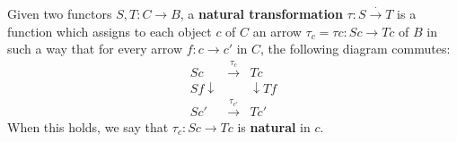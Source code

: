 Given two functors $S, T: C \rightarrow B$, a \textbf{natural transformation} $\tau: S \xrightarrow{\cdot} T$ is a function which assigns to each object $c$ of $C$ an arrow $\tau_c = \tau c: Sc \rightarrow Tc$ of $B$ in such a way that for every arrow $f: c \rightarrow c'$ in $C$, the following diagram commutes:
\[
\begin{array}{ccc}
Sc & \xrightarrow{\tau_c} & Tc \\
{\scriptstyle Sf}\downarrow & & \downarrow{\scriptstyle Tf} \\
Sc' & \xrightarrow{\tau_{c'}} & Tc'
\end{array}
\]
When this holds, we say that $\tau_c: Sc \rightarrow Tc$ is \textbf{natural} in $c$.